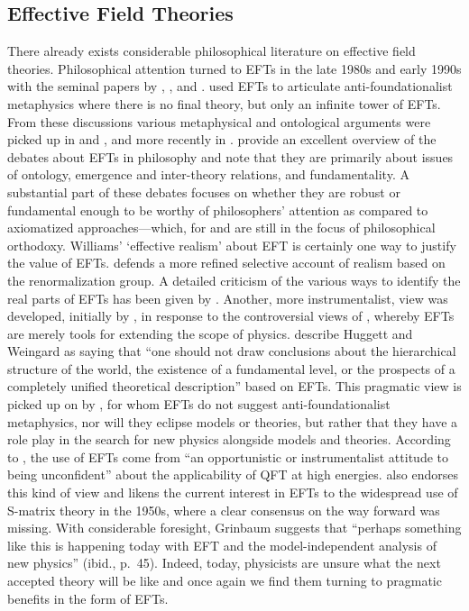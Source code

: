 \subsection{Effective Field Theories}\label{PhilEFT}

There already exists considerable philosophical literature on effective field theories.
Philosophical attention turned to EFTs in the late 1980s and early 1990s with the seminal papers by \citet{teller89}, \citet{cao1993}, and \citet{huggetweingard}. 
\citet{cao1993} used EFTs to articulate anti-foundationalist metaphysics where there is no final theory, but only an infinite tower of EFTs. 
From these discussions various metaphysical and ontological arguments were picked up in \citet{castellani2002} and \citet{fraser2009}, and more recently in \citep{bain2013a,Crowther2016-CROESU,Rivat2020-RIVPFO,Ruetsche2018,williams2018}. 
\citet{Rivat2020-RIVPFO} provide an excellent overview of the debates about EFTs in philosophy and note that they are primarily about issues of ontology, emergence and inter-theory relations, and fundamentality. 
A substantial part of these debates focuses on whether they are robust or fundamental enough to be worthy of philosophers' attention as compared to axiomatized approaches---which, for \citet{wallace2006} and \citet{williams2018} are still in the focus of philosophical orthodoxy. 
Williams' `effective realism' about EFT is certainly one way to justify the value of EFTs. 
\citet{fraserj2020} defends a more refined selective account of realism based on  the renormalization group. 
A detailed criticism of the various ways to identify the real parts of EFTs has been given by \citep{rivat2020a}.
Another, more instrumentalist, view was developed, initially by \citet{huggetweingard}, in response to the controversial views of \citet{cao1993}, whereby EFTs are merely tools for extending the scope of physics. 
\citet{Rivat2020-RIVPFO} describe Huggett and Weingard as saying that 
``one should not draw conclusions about the hierarchical structure of the world, the existence of a fundamental level, or the prospects of a completely unified theoretical description'' based on EFTs.
This pragmatic view is picked up on by \citet{hartmann2001}, for whom EFTs do not suggest anti-foundationalist metaphysics, nor will they eclipse models or theories, but rather that they have a role play in the search for new physics alongside models and theories.
According to \citet{Butterfield_2010}, the use of EFTs come from ``an opportunistic or instrumentalist attitude to being unconfident'' about the applicability of QFT at high energies.
\citet{Grinbaum2008-GRIOTE} also endorses this kind of view and likens the current interest in EFTs to the widespread use of S-matrix theory in the 1950s, where a clear consensus on the way forward was missing. 
With considerable foresight, Grinbaum suggests that ``perhaps something like this is happening today with EFT and the model-independent analysis of new physics'' (ibid., p.~45).
Indeed, today, physicists are unsure what the next accepted theory will be like and once again we find them turning to pragmatic benefits in the form of EFTs.

